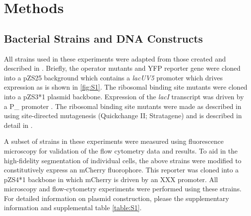 \pagebreak
\section*{Methods }

\subsection{Bacterial Strains and DNA Constructs}
All strains used in these experiments were adapted from those created and
described in \citep{Garcia2011}. Briefly, the operator mutants and YFP reporter
gene were cloned into a pZS25 background which contains a \textit{lacUV5}
promoter which drives expression as is shown in \ref{fig:S1}. The ribosomal
binding site mutants were cloned into a pZS3*1 plasmid backbone. Expression of
the \textit{lacI} transcript was driven by a P_ promoter
\cite{Lutz1997}. The ribosomal binding site mutants were made as described in
\citep{Salis2009} using site-directed mutagenesis (Quickchange II; Stratagene)
and is described in detail in \citep{Garcia2011}.

A subset of strains in these experiments were measured using fluorescence
microscopy for validation of the flow cytometry data and results. To aid in the
high-fidelity segmentation of individual cells, the above strains were
modified to constitutively express an mCherry fluorophore. This reporter was
cloned into a pZS4*1 backbone in which mCherry is driven by an XXX promoter.
All microscopy and flow-cytometry experiments were performed using these
strains. For detailed information on plasmid construction, please the
supplementary information and supplemental table \ref{table:S1}.


